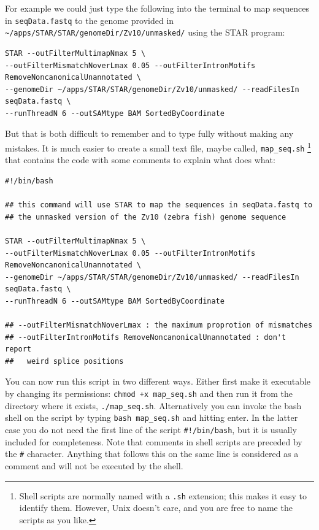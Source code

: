 \documentclass[11pt]{article}
\begin{document}
For example we could just type the following into the terminal to map
sequences in \texttt{seqData.fastq} to the genome provided in
\texttt{\textasciitilde{}/apps/STAR/STAR/genomeDir/Zv10/unmasked/}
using the STAR program:

\begin{verbatim}
STAR --outFilterMultimapNmax 5 \
--outFilterMismatchNoverLmax 0.05 --outFilterIntronMotifs RemoveNoncanonicalUnannotated \
--genomeDir ~/apps/STAR/STAR/genomeDir/Zv10/unmasked/ --readFilesIn seqData.fastq \
--runThreadN 6 --outSAMtype BAM SortedByCoordinate
\end{verbatim}

But that is both difficult to remember and to type fully without
making any mistakes. It is much easier to create a small text file,
maybe called, \texttt{map\_seq.sh} \footnote{Shell scripts are normally named with a \texttt{.sh} extension; this
makes it easy to identify them. However, Unix doesn't care, and you
are free to name the scripts as you like.} that contains the code with some
comments to explain what does what:

\begin{verbatim}
#!/bin/bash

## this command will use STAR to map the sequences in seqData.fastq to
## the unmasked version of the Zv10 (zebra fish) genome sequence

STAR --outFilterMultimapNmax 5 \
--outFilterMismatchNoverLmax 0.05 --outFilterIntronMotifs RemoveNoncanonicalUnannotated \
--genomeDir ~/apps/STAR/STAR/genomeDir/Zv10/unmasked/ --readFilesIn seqData.fastq \
--runThreadN 6 --outSAMtype BAM SortedByCoordinate

## --outFilterMismatchNoverLmax : the maximum proprotion of mismatches
## --outFilterIntronMotifs RemoveNoncanonicalUnannotated : don't report 
##   weird splice positions
\end{verbatim}

You can now run this script in two different ways. Either first make it
executable by changing its permissions: \texttt{chmod +x map\_seq.sh} and then run it
from the directory where it exists, \texttt{./map\_seq.sh}. Alternatively you can
invoke the bash shell on the script by typing \texttt{bash map\_seq.sh} and hitting
enter. In the latter case you do not need the first line of the script
\texttt{\#!/bin/bash}, but it is usually included for completeness. Note that comments
in shell scripts are preceded by the \texttt{\#} character. Anything that follows
this on the same line is considered as a comment and will not be executed by
the shell.
\end{document}
